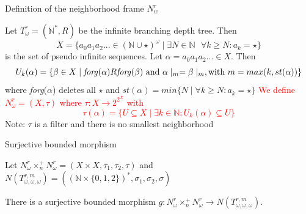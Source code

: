 \begin{frame}{Definition of the neighborhood frame $N_w^r$}
    \begin{definition}
        Let $T_{\omega}^{r} = (\mathbb{N}^*, R)$ be the infinite branching depth tree. Then
		\[
		X = \{a_0a_1a_2... \in (\mathbb{N} \cup \star)^\omega \mid \exists N \in \mathbb{N} \mbox{ }\forall k\geq N: a_k = \star\}
		\]
		is the set of pseudo infinite sequences. 
		Let $\alpha =a_0a_1a_2... \in X$. Then 
		\[
		U_k(\alpha) = \{\beta \in X \mid {\mbox{\emph{forg}}}(\alpha) R \mbox{}\mbox{\emph{forg}}(\beta) \mbox{ and } \alpha \mid_m = \beta \mid_m,	 \mbox{with } m = max(k,st(\alpha))\} 
		\] 
		where \emph{forg}($\alpha$) deletes all $\star$ and $st(\alpha) = min\{N \mid \forall k \geq N: a_k = \star\}$ \newline \newline \pause
		\textcolor{red}{We define $N_\omega^r = (X,\tau)$ where $\tau: X \to 2^{2^X}$ with 
			\[
				\tau(\alpha) = \{U \subseteq X \mid \exists k \in \mathbb{N}: U_k(\alpha) \subseteq U\}
			\]}
			Note: $\tau$ is a filter and there is no smallest neighborhood
		
    \end{definition}
\end{frame}

\begin{frame}[t]{Surjective bounded morphism}
	
	Let $N_\omega^r \times_n^+ N_\omega^r = (X \times X, \tau_1, \tau_2, \tau)$ and $N(T_{\omega,\omega,\omega}^{r,m}) = ((\mathbb{N} \times \{0,1,2\})^*, \sigma_1, \sigma_2, \sigma)$\pause
	\begin{theorem}
	 There is a surjective bounded morphism $g: N_\omega^r \times_n^+ N_\omega^r \to N(T_{\omega,\omega,\omega}^{r,m})$. 
	\end{theorem}



\end{frame}


